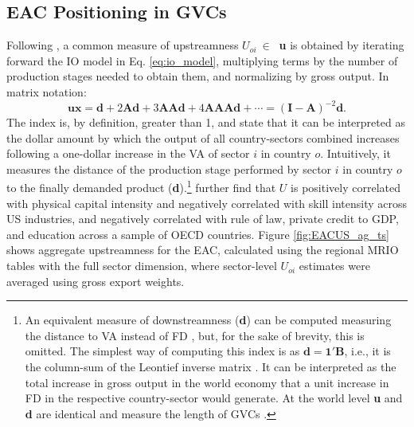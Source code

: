 \documentclass[a4paper]{article}
\begin{document}
\subsection{EAC Positioning in GVCs}

Following \citet{antras2012measuring, antras2022global}, a common measure of upstreamness $U_{oi} \ \in \ $ \textbf{u} is obtained by iterating forward the IO model in Eq. \ref{eq:io_model}, multiplying terms by the number of production stages needed to obtain them, and normalizing by gross output. In matrix notation: 
%
\begin{equation} \label{eq:upstreamness}
\textbf{u}\textbf{x} = \textbf{d} + 2\textbf{Ad} + 3\textbf{AAd} + 4\textbf{AAAd} + \cdots = (\textbf{I}-\textbf{A})^{-2}\textbf{d}.
\end{equation}
%
The index is, by definition, greater than 1, and \citet{antras2012measuring} state that it can be interpreted as the dollar amount by which the output of all country-sectors combined increases following a one-dollar increase in the VA of sector $i$ in country $o$. Intuitively, it measures the distance of the production stage performed by sector $i$ in country $o$ to the finally demanded product (\textbf{d}).\footnote{\label{fn:ds} An equivalent measure of downstreamness (\textbf{d}) can be computed measuring the distance to VA instead of FD \citep{antras2022global, miller2017output, mancini2023positioning}, but, for the sake of brevity, this is omitted. The simplest way of computing this index is as $\textbf{d}=\textbf{1}'\textbf{B}$, i.e., it is the column-sum of the Leontief inverse matrix \citep{miller2017output, antras2022global}. It can be interpreted as the total increase in gross output in the world economy that a unit increase in FD in the respective country-sector would generate. At the world level \textbf{u} and \textbf{d} are identical and measure the length of GVCs \citep{mancini2023positioning}.} \citet{antras2012measuring} further find that $U$ is positively correlated with physical capital intensity and negatively correlated with skill intensity across US industries, and negatively correlated with rule of law, private credit to GDP, and education across a sample of OECD countries. Figure \ref{fig:EACUS_ag_ts} shows aggregate upstreamness for the EAC, calculated using the regional MRIO tables with the full sector dimension, where sector-level $U_{oi}$ estimates were averaged using gross export weights. 
\end{document}
